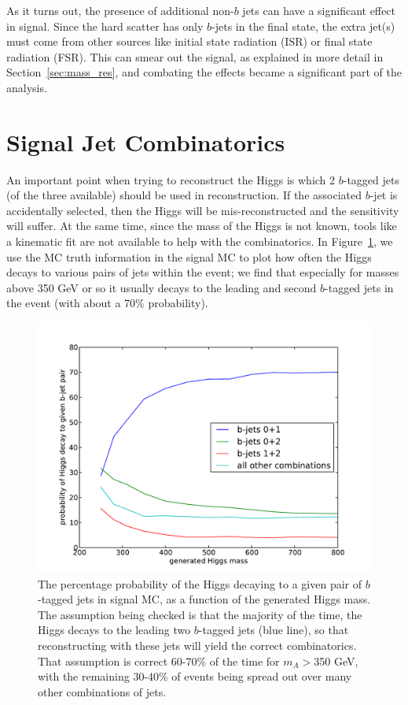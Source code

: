 
As it turns out, the presence of additional non-$b$ jets can have a significant 
effect in signal.  Since the hard scatter has only $b$-jets in the final state, the
extra jet(s) must come from other sources like initial state radiation (ISR) or 
final state radiation (FSR).  This can smear out the signal, as explained in more detail
in Section~\ref{sec:mass_res}, and combating the effects became a significant part of the
analysis.


\section{Signal Jet Combinatorics}
\label{sec:combinatorics}
An important point when trying to reconstruct the Higgs is which 2 $b$-tagged jets (of the
three available) should be used in reconstruction.  If the associated $b$-jet is accidentally
selected, then the Higgs will be mis-reconstructed and the sensitivity will suffer.  At the same time,
since the mass of the Higgs is not known, tools like a kinematic fit are not available to
help with the combinatorics.  In Figure~\ref{fig:combinatorics}, we use the MC truth
information in the signal MC to plot how often the Higgs decays to various pairs of jets
within the event; we find that especially for masses above 350 GeV or so it usually decays to
the leading and second $b$-tagged jets in the event (with about a 70\% probability).
    
\begin{figure}[hbt]
  \center
  \includegraphics[width=0.78\linewidth]{SignalKin/combinatorics.pdf}
  \caption{The percentage probability of the Higgs decaying to a given pair of $b$-tagged jets in signal MC,
    as a function of the generated Higgs mass.  The assumption being checked is that the majority of
    the time, the Higgs decays to the leading two $b$-tagged jets (blue line), so that reconstructing with these jets
    will yield the correct combinatorics.  That assumption is correct 60-70\% of the time for $m_A>$350 GeV,
    with the remaining 30-40\% of events being spread out over many other combinations of jets.
    \label{fig:combinatorics}}
\end{figure}
                                                                                                                                    
